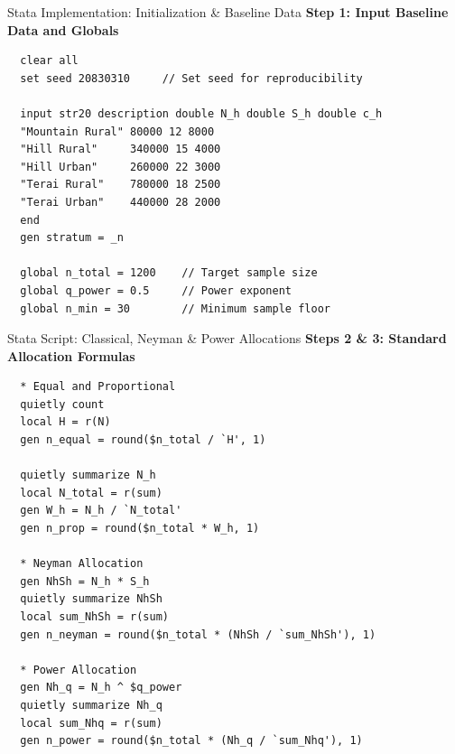 \documentclass[10pt, aspectratio=169]{beamer}
\begin{document}
  \begin{frame}[fragile]{Stata Implementation: Initialization \& Baseline Data}
      \small \textbf{Step 1: Input Baseline Data and Globals}
      \vspace{0.1cm}
  \begin{verbatim}
  clear all
  set seed 20830310     // Set seed for reproducibility
  
  input str20 description double N_h double S_h double c_h
  "Mountain Rural" 80000 12 8000
  "Hill Rural"     340000 15 4000
  "Hill Urban"     260000 22 3000
  "Terai Rural"    780000 18 2500
  "Terai Urban"    440000 28 2000
  end
  gen stratum = _n
  
  global n_total = 1200    // Target sample size
  global q_power = 0.5     // Power exponent
  global n_min = 30        // Minimum sample floor
  \end{verbatim}
  \end{frame}
  
  \begin{frame}[fragile]{Stata Script: Classical, Neyman \& Power Allocations}
      \small \textbf{Steps 2 \& 3: Standard Allocation Formulas}
      \vspace{0.1cm}
  \begin{verbatim}
  * Equal and Proportional
  quietly count
  local H = r(N)
  gen n_equal = round($n_total / `H', 1)
  
  quietly summarize N_h
  local N_total = r(sum)
  gen W_h = N_h / `N_total'
  gen n_prop = round($n_total * W_h, 1)
  
  * Neyman Allocation
  gen NhSh = N_h * S_h
  quietly summarize NhSh
  local sum_NhSh = r(sum)
  gen n_neyman = round($n_total * (NhSh / `sum_NhSh'), 1)
  
  * Power Allocation
  gen Nh_q = N_h ^ $q_power
  quietly summarize Nh_q
  local sum_Nhq = r(sum)
  gen n_power = round($n_total * (Nh_q / `sum_Nhq'), 1)
  \end{verbatim}
  \end{frame}
  
\end{document}
